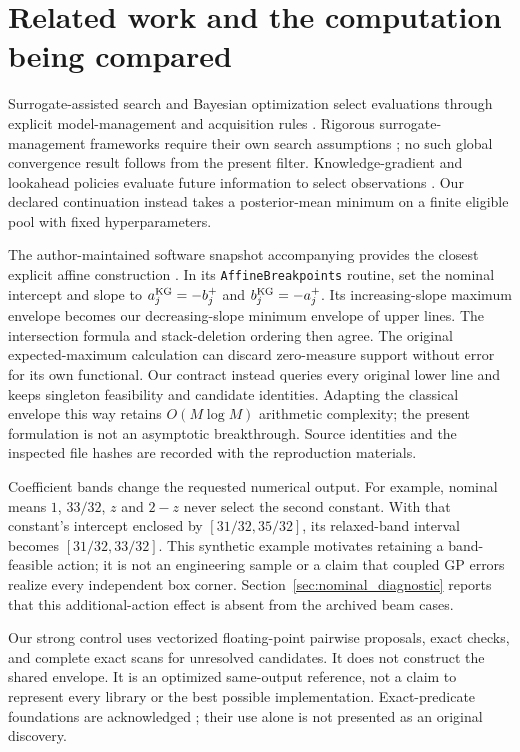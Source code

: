 \documentclass[]{interact}
\begin{document}
\section{Related work and the computation being compared}

Surrogate-assisted search and Bayesian optimization select evaluations through explicit model-management and acquisition rules \citep{ref01,ref02,ref03,ref18}. Rigorous surrogate-management frameworks require their own search assumptions \citep{ref38}; no such global convergence result follows from the present filter. Knowledge-gradient and lookahead policies evaluate future information to select observations \citep{ref39,ref40}. Our declared continuation instead takes a posterior-mean minimum on a finite eligible pool with fixed hyperparameters.

The author-maintained software snapshot accompanying \citet{ref40} provides the closest explicit affine construction \citep{ref42}. In its \texttt{AffineBreakpoints} routine, set the nominal intercept and slope to $a^{\rm KG}_j=-b_j^+$ and $b^{\rm KG}_j=-a_j^+$. Its increasing-slope maximum envelope becomes our decreasing-slope minimum envelope of upper lines. The intersection formula and stack-deletion ordering then agree. The original expected-maximum calculation can discard zero-measure support without error for its own functional. Our contract instead queries every original lower line and keeps singleton feasibility and candidate identities. Adapting the classical envelope this way retains $O(M\log M)$ arithmetic complexity; the present formulation is not an asymptotic breakthrough. Source identities and the inspected file hashes are recorded with the reproduction materials.

Coefficient bands change the requested numerical output. For example, nominal means $1$, $33/32$, $z$ and $2-z$ never select the second constant. With that constant's intercept enclosed by $[31/32,35/32]$, its relaxed-band interval becomes $[31/32,33/32]$. This synthetic example motivates retaining a band-feasible action; it is not an engineering sample or a claim that coupled GP errors realize every independent box corner. Section~\ref{sec:nominal_diagnostic} reports that this additional-action effect is absent from the archived beam cases.

Our strong control uses vectorized floating-point pairwise proposals, exact checks, and complete exact scans for unresolved candidates. It does not construct the shared envelope. It is an optimized same-output reference, not a claim to represent every library or the best possible implementation. Exact-predicate foundations are acknowledged \citep{ref41}; their use alone is not presented as an original discovery.
\end{document}
